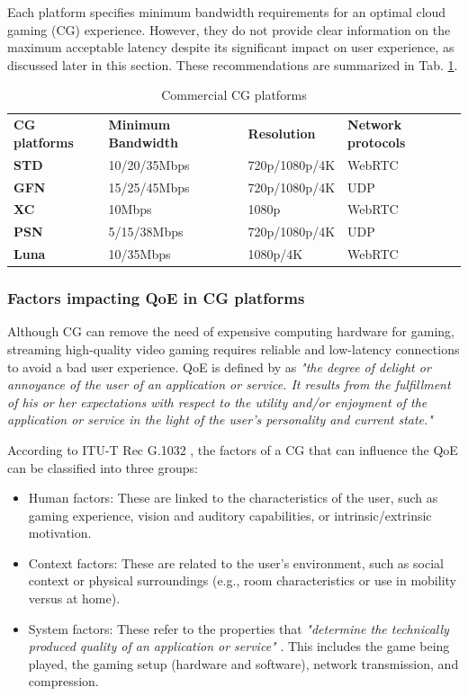 Each platform specifies minimum bandwidth requirements for an optimal cloud gaming (CG) experience. However, they do not provide clear information on the maximum acceptable latency  despite its significant impact on user experience, as discussed later in this section. These recommendations are summarized in Tab. \ref{tab:cg_platforms}.
\begin{table}[!ht]
\setlength\tabcolsep{1pt} 
    
\begin{tabular*}{\linewidth}{@{\extracolsep{\fill}} llll}
    \toprule
       \bf CG platforms & \bf Minimum Bandwidth & \bf Resolution & \bf Network protocols \\
    \addlinespace
    \cmidrule{1-4}
    \bf STD & 10/20/35Mbps & 720p/1080p/4K &  WebRTC \\ 
    \bf GFN & 15/25/45Mbps & 720p/1080p/4K & UDP \\
    \bf XC & 10Mbps & 1080p & WebRTC \\
    \bf PSN & 5/15/38Mbps & 720p/1080p/4K & UDP \\
    \bf Luna & 10/35Mbps & 1080p/4K & WebRTC \\
    \bottomrule

\end{tabular*}
\caption{Commercial CG platforms}
\label{tab:cg_platforms}
\end{table}

\subsubsection{Factors impacting QoE in CG platforms}
Although \ac{CG} can remove the need of expensive computing hardware for gaming, streaming high-quality video gaming requires reliable and low-latency connections to avoid a bad user experience. \ac{QoE} is defined by \cite{le2013qualinet} as \textit{"the degree of delight or annoyance of the user of an application or service. It results from the fulfillment of his or her expectations with respect to the utility and/or enjoyment of the application or service in the light of the user’s personality and current state."}

According to ITU-T Rec G.1032 \cite{itut1032}, the factors of a CG that can influence the \ac{QoE} can be classified into three groups:
\begin{itemize}
    \item Human factors: These are linked to the characteristics of the user, such as gaming experience, vision and auditory capabilities, or intrinsic/extrinsic motivation.
    \item Context factors: These are related to the user’s environment, such as social context or physical surroundings (e.g., room characteristics or use in mobility versus at home).
    \item System factors: These refer to the properties that \textit{"determine the technically produced quality of an application or service"} \cite{itut1032}. This includes the game being played, the gaming setup (hardware and software), network transmission, and compression.
\end{itemize}

